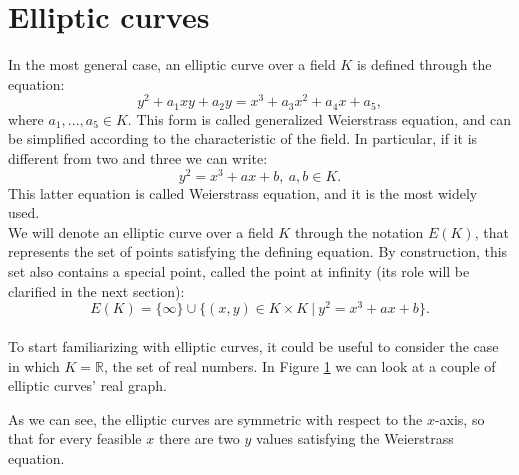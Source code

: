 \section{Elliptic curves}
\label{ec}
In the most general case, an elliptic curve over a field $K$ is defined through the equation: $$y^2 + a_1xy + a_2y = x^3 + a_3x^2 + a_4x + a_5,$$ where $a_1, ..., a_5 \in K$. This form is called generalized Weierstrass equation, and can be simplified according to the characteristic of the field. In particular, if it is different from two and three we can write:
$$y^2 = x^3 + ax + b, \ a, b \in K.$$
This latter equation is called Weierstrass equation, and it is the most widely used.
\\
We will denote an elliptic curve over a field $K$ through the notation $E(K)$, that represents the set of points satisfying the defining equation. By construction, this set also contains a special point, called the point at infinity (its role will be clarified in the next section): 
$$E(K) = \{\infty\}\cup\{(x, y) \in K \times K \ | \ y^2 = x^3 + ax + b\}.$$
\\
To start familiarizing with elliptic curves, it could be useful to consider the case in which $K = \mathbb{R}$, the set of real numbers. In Figure \ref{fig:figure1} we can look at a couple of elliptic curves' real graph.
\begin{figure}
	\noindent
	\label{fig:figure1}
\end{figure}
\noindent
As we can see, the elliptic curves are symmetric with respect to the $x$-axis, so that for every feasible $x$ there are two $y$ values satisfying the Weierstrass equation.
